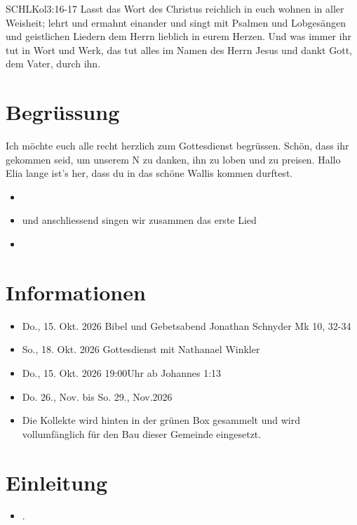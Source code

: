 \documentclass[fontsize=14pt]{mybib}
\author{OTS}
\newcommand{\Name}{Elia}
\begin{document}
\begin{bibelbox}{SCHL}{Kol}{3:16-17}
    Lasst das Wort des Christus reichlich in euch wohnen in aller Weisheit; lehrt und ermahnt einander und singt mit Psalmen und Lobgesängen und geistlichen Liedern dem Herrn lieblich in eurem Herzen. Und was immer ihr tut in Wort und Werk, das tut alles im Namen des Herrn Jesus und dankt Gott, dem Vater, durch ihn.
\end{bibelbox}
\section{Begrüssung}
Ich möchte euch alle recht herzlich zum Gottesdienst begrüssen. Schön, dass ihr gekommen seid, um unserem \herr N zu danken, ihn zu loben und zu preisen. 
Hallo \Name{} lange ist's her, dass du in das schöne Wallis kommen durftest.

\begin{itemize}
    \item {}
    \item und anschliessend singen wir zusammen das erste Lied
    \item {}
\end{itemize}

\section{Informationen}
\begin{itemize}
    \item {} Do., 15. Okt. 2026 Bibel und Gebetsabend Jonathan Schnyder Mk 10, 32-34
    \item {} So., 18. Okt. 2026 Gottesdienst  mit Nathanael Winkler
    \item {} Do., 15. Okt. 2026 19:00Uhr ab Johannes 1:13   
    \item {} Do. 26., Nov. bis So. 29., Nov.2026 
    \item {} Die Kollekte wird hinten in der grünen Box gesammelt und wird vollumfänglich für den Bau dieser Gemeinde eingesetzt.
\end{itemize}
\section{Einleitung}

\begin{itemize}
    \item {}.
\end{itemize}
\end{document}
